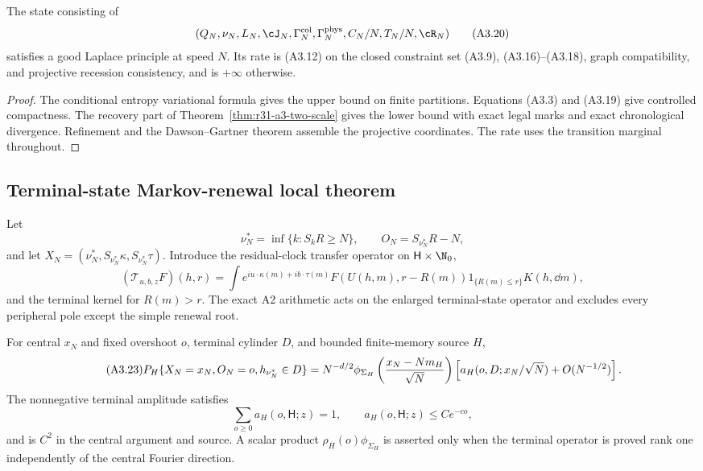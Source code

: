 \begin{theorem}
\label{thm:r31-a3-ldp}
The state consisting of
\[
 (Q_N,\nu_N,L_N,\cJ_N,\Gamma_N^{\rm col},
  \Gamma_N^{\rm phys},C_N/N,T_N/N,\cR_N)                 \tag{A3.20}
\]
satisfies a good Laplace principle at speed $N$.  Its rate is (A3.12) on the
closed constraint set (A3.9), (A3.16)--(A3.18), graph compatibility, and
projective recession consistency, and is $+\infty$ otherwise.
\end{theorem}

\begin{proof}
The conditional entropy variational formula gives the upper bound on finite
partitions.  Equations (A3.3) and (A3.19) give controlled compactness.  The
recovery part of Theorem~\ref{thm:r31-a3-two-scale} gives the lower bound with
exact legal marks and exact chronological divergence.  Refinement and the
Dawson--Gartner theorem assemble the projective coordinates.  The rate uses
the transition marginal throughout.
\end{proof}

\subsection{Terminal-state Markov-renewal local theorem}

Let
\[
 \nu_N^*=\inf\{k:S_kR\ge N\},\qquad O_N=S_{\nu_N^*}R-N,   \tag{A3.21}
\]
and let
$X_N=(\nu_N^*,S_{\nu_N^*}\kappa,S_{\nu_N^*}\tau)$.
Introduce the residual-clock transfer operator on
$\mathsf H\times\N_0$,
\[
 (\mathscr T_{u,b,z}F)(h,r)
 =\int e^{iu\cdot\kappa(m)+ib\cdot\tau(m)}
 F(U(h,m),r-R(m))1_{\{R(m)\le r\}}K(h,\dd m),             \tag{A3.22}
\]
and the terminal kernel for $R(m)>r$.  The exact A2 arithmetic acts on the
enlarged terminal-state operator and excludes every peripheral pole except the
simple renewal root.

\begin{theorem}
\label{thm:r31-a3-stopped}
For central $x_N$ and fixed overshoot $o$, terminal cylinder $D$, and bounded
finite-memory source $H$,
\begin{equation}\tag{A3.23}
 P_H\{X_N=x_N,O_N=o,h_{\nu_N^*}\in D\}
 =N^{-d/2}\phi_{\Sigma_H}
   \left({x_N-Nm_H\over\sqrt N}\right)
 \left[a_H(o,D;x_N/\sqrt N)+O(N^{-1/2})\right].
\end{equation}
The nonnegative terminal amplitude satisfies
\[
 \sum_{o\ge0}a_H(o,\mathsf H;z)=1,\qquad
 a_H(o,\mathsf H;z)\le Ce^{-co},                          \tag{A3.24}
\]
and is $C^2$ in the central argument and source.  A scalar product
$\rho_H(o)\phi_{\Sigma_H}$ is asserted only when the terminal operator is
proved rank one independently of the central Fourier direction.
\end{theorem}

